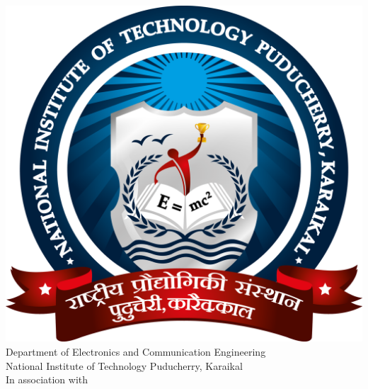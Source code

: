\documentclass[12pt]{article}
\begin{document}
{\begin{center}
		\includegraphics[scale=0.12]{nitpy-logo.png}\\ \vspace{0.25cm}
		Department of Electronics and Communication Engineering\\
		National Institute of Technology Puducherry, Karaikal \\
		\vspace{0.25cm}
		In association with\\ \vspace{0.25cm}
		\begin{table}[h!]
			\centering
			\small
			\begin{tabular}{cc}

\end{tabular}
\end{table}
\end{center}}
\end{document}
